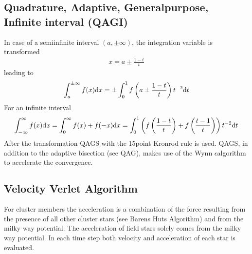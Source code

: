 \documentclass[letterpaper,10pt,english]{sphinxmanual}
\begin{document}
			\subsection{Quadrature, Adaptive, General\sphinxhyphen{}purpose, Infinite interval (QAGI)}
				\label{\detokenize{NBodySimulation/Integration:quadrature-adaptive-general-purpose-infinite-interval-qagi}}
				\sphinxAtStartPar
				In case of a semi\sphinxhyphen{}infinite interval \((a,\pm \infty)\), the integration variable is transformed
				\begin{equation*}
				\begin{split}x = a\pm\frac{1-t}{t}\end{split}
				\end{equation*}
				\sphinxAtStartPar
				leading to
				\begin{equation*}
				\begin{split}\int_a^{\pm \infty}f(x)\textup{d}x = \pm \int_0^1 f \left(a\pm\frac{1-t}{t}\right)t^{-2}\textup{d}t\end{split}
				\end{equation*}
				\sphinxAtStartPar
				For an infinite interval
				\begin{equation*}
				\begin{split}\int_{-\infty}^{\infty}f(x)\textup{d}x =
				\int_0^\infty f(x)+f(-x)\textup{d}x =
				\int_0^1  \left ( f \left(\frac{1-t}{t}\right) + f \left(\frac{t-1}{t}\right) \right )  t^{-2}\textup{d}t\end{split}
				\end{equation*}
				\sphinxAtStartPar
				After the transformation QAGS with the 15\sphinxhyphen{}point Kronrod rule is used.
				QAGS, in addition to the adaptive bisection (see QAG), makes use of the Wynn \(\epsilon\)\sphinxhyphen{}algorithm to accelerate the convergence.
			
			
			\subsection{Velocity Verlet Algorithm}
				\label{\detokenize{NBodySimulation/Integration:velocity-verlet-algorithm}}
				\sphinxAtStartPar
				For cluster members the acceleration is a combination of the force resulting from the presence of all other cluster stars (see Barens Huts Algorithm)
				and from the milky way potential. The acceleration of field stars solely comes from the milky way potential.
				In each time step both velocity and acceleration of each star is evaluated.
				
\end{document}
